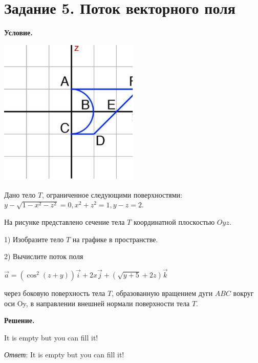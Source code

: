 \section{Задание 5. Поток векторного поля}

\textbf{Условие.}

\begin{multicols}{2}
    \includegraphics[height=7cm]{images/5a1}

    Дано тело $T$, ограниченное следующими поверхностями: $\displaystyle y - \sqrt{1 - x^2 - z^2} = 0, x^2 + z^2 = 1, y - z = 2$.

    На рисунке представлено сечение тела $T$ координатной плоскостью $Oyz$.

    1) Изобразите тело $T$ на графике в пространстве.

    2) Вычислите поток поля

    $\displaystyle \overrightarrow{a} = (\cos^2(z + y))\overrightarrow{i} + 2x\overrightarrow{j} + \left(\sqrt{y + 5} + 2z\right) \overrightarrow{k}$

    через боковую поверхность тела $T$, образованную вращением дуги $ABC$ вокруг оси Oy, в направлении внешней нормали поверхности тела $T$.
\end{multicols}


\vspace{10mm}
\textbf{Решение.}

It is empty but you can fill it!

\textit{Ответ}:  It is empty but you can fill it!
\clearpage
